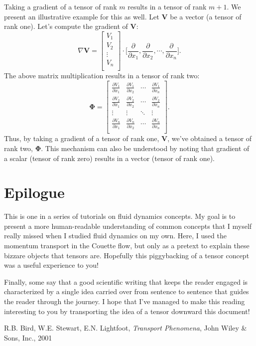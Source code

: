 \documentclass[10pt,twocolumn]{article}
\begin{document}
Taking a gradient of a tensor of rank $m$ results in a tensor of rank $m+1$. We present an illustrative example for this as well.
Let $\mathbf{V}$ be a vector (a tensor of rank one). Let's compute the gradient of $\mathbf{V}$:
\begin{equation*}
  \nabla \mathbf{V} =
  \begin{bmatrix}
  V_1 \\
  V_2 \\
  \vdots \\
  V_n \\
  \end{bmatrix}
  \cdot 
  \Big[ \frac{\partial}{\partial x_1} , \frac{\partial}{\partial x_2}, \cdots , \frac{\partial}{\partial x_n} \Big].
\end{equation*}
The above matrix multiplication results in a tensor of rank two:
\begin{equation*}
\pmb{\Phi} =
  \begin{bmatrix}
  \frac{\partial V_1}{\partial x_1} & \frac{\partial V_1}{\partial x_2} & \cdots & \frac{\partial V_1}{\partial x_n} \\
  \frac{\partial V_2}{\partial x_1} & \frac{\partial V_2}{\partial x_2} & \cdots & \frac{\partial V_2}{\partial x_n} \\
  \vdots & \vdots & \ddots & \vdots \\
  \frac{\partial V_n}{\partial x_1} & \frac{\partial V_n}{\partial x_2} & \cdots & \frac{\partial V_n}{\partial x_n} \\
  \end{bmatrix}.
\end{equation*}
Thus, by taking a gradient of a tensor of rank one, $\mathbf{V}$, we've obtained a tensor of rank two, $\pmb{\Phi}$. This mechanism can also be understood by noting that gradient of a scalar (tensor of rank zero) results in a vector (tensor of rank one).

\section*{Epilogue}

This is one in a series of tutorials on fluid dynamics concepts. My goal is to present a more human-readable understanding of common concepts that I myself really missed when I studied fluid dynamics on my own. Here, I used the momentum transport in the Couette flow, but only as a pretext to explain these bizzare objects that tensors are. Hopefully this piggybacking of a tensor concept was a useful experience to you!

Finally, some say that a good scientific writing that keeps the reader engaged is characterized by a single idea carried over from sentence to sentence that guides the reader through the journey. I hope that I've managed to make this reading interesting to you by transporting the idea of a tensor downward this document!

\thebibliography{}

 R.B. Bird, W.E. Stewart, E.N. Lightfoot, \textit{Transport Phenomena}, John Wiley \& Sons, Inc., 2001
\end{document}
